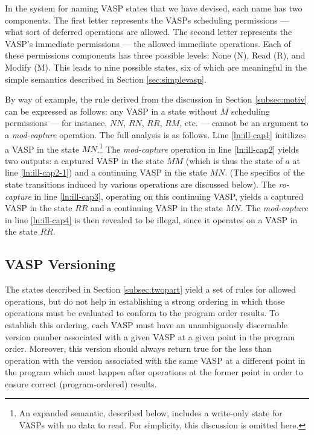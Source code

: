 In the system for naming VASP states that we have devised, each name has two
components.  The first letter represents the VASPs scheduling permissions ---
what sort of deferred operations are allowed.  The second letter represents the
VASP's immediate permissions --- the allowed immediate operations.  Each of
these permissions components has three possible levels: None (N), Read (R), and
Modify (M).  This leads to nine possible states, six of which are meaningful in
the simple semantics described in Section \ref{sec:simplevasp}.  

By way of example, the rule derived from the discussion in Section
\ref{subsec:motiv} can be expressed as follows:  any VASP in a state without $M$
scheduling permissions --- for instance, $NN$, $RN$, $RR$, $RM$, etc. --- cannot
be an argument to a {\em mod-capture} operation.  The full analysis is as
follows.  Line \ref{ln:ill-cap1} initilizes a VASP in the state
$MN$.\footnote{An expanded semantic, described below, includes a write-only
state for VASPs with no data to read.  For simplicity, this discussion is
omitted here.}  The {\em mod-capture} operation in line \ref{ln:ill-cap2} yields
two outputs:  a captured VASP in the state $MM$ (which is thus the state of $a$
at line \ref{ln:ill-cap2-1}) and a continuing VASP in the state $MN$.  (The
specifics of the state transitions induced by various operations are discussed
below).  The {\em ro-capture} in line \ref{ln:ill-cap3}, operating on this
continuing VASP, yields a captured VASP in the state $RR$ and a continuing VASP
in the state $MN$.  The {\em mod-capture} in line \ref{ln:ill-cap4} is then
revealed to be illegal, since it operates on a VASP in the state $RR$.

\subsection{VASP Versioning}

The states described in Section \ref{subsec:twopart} yield a set of rules for
allowed operations, but do not help in establishing a strong ordering in which
those operations must be evaluated to conform to the program order results.  To
establish this ordering, each VASP must have an unambiguously discernable
version number associated with a given VASP at a given point in the program
order.  Moreover, this version should always return true for the less than
operation with the version associated with the same VASP at a different point in
the program which must happen after operations at the former point in order to
ensure correct (program-ordered) results.

